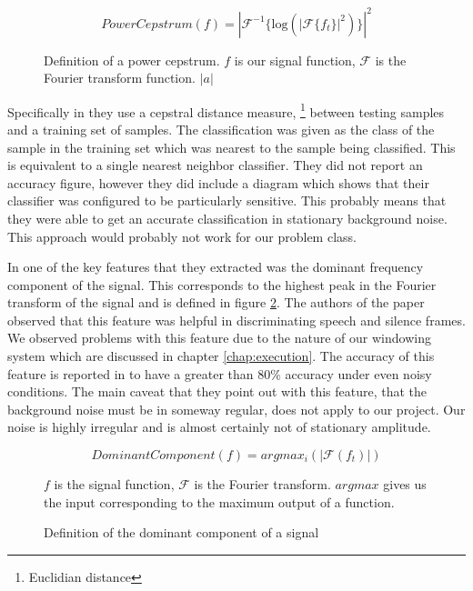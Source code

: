 \documentclass[ %
                    author={Sam Phippen},
                supervisor={Dr. Rafal Bogacz},
                     title={Real time voice activity detectors in noisy personal computing environments},
                  subtitle={},
                    degree={MEng},
                      year={2012} ]{thesis}
\begin{document}
\begin{figure}
    $$PowerCepstrum(f)=|\mathcal{F}^{-1}\{\mbox{log}(|\mathcal{F}\{ f_t \}|^2)\}|^2$$
    \caption{Definition of a power cepstrum. $f$ is our
    signal function, $\mathcal{F}$ is the Fourier transform function. $|a|$}
    \label{eqn:power-cepstrum}

\end{figure}

Specifically in \cite{haigh} they use a cepstral distance measure,
\footnote{Euclidian distance} between testing samples and a training set of
samples. The classification was given as the class of the sample in the
training set which was nearest to the sample being classified. This is
equivalent to a single nearest neighbor classifier. They did not report an
accuracy figure, however they did include a diagram which shows that their
classifier was configured to be particularly sensitive. This probably means
that they were able to get an accurate classification in stationary background
noise. This approach would probably not work for our problem class.

In \cite{moattar} one of the key features that they extracted was the dominant
frequency component of the signal. This corresponds to the highest peak in the
Fourier transform of the signal and is defined in figure \ref{eqn:dom-freq}.
The authors of the paper observed that this feature was helpful in
discriminating speech and silence frames. We observed problems with this
feature due to the nature of our windowing system which are discussed in
chapter \ref{chap:execution}. The accuracy of this feature is reported in
\cite{moattar} to have a greater than 80\% accuracy under even noisy
conditions. The main caveat that they point out with this feature, that the
background noise must be in someway regular, does not apply to our project. Our
noise is highly irregular and is almost certainly not of stationary amplitude.

\begin{figure}
    $$DominantComponent(f) = argmax_i(|\mathcal{F}(f_t)|)$$

    $f$ is the signal
    function, $\mathcal{F}$ is the Fourier transform. $argmax$ gives us the
    input corresponding to the maximum output of a function.
    \caption{Definition of the dominant component of a signal}
    \label{eqn:dom-freq}
\end{figure}
\end{document}
